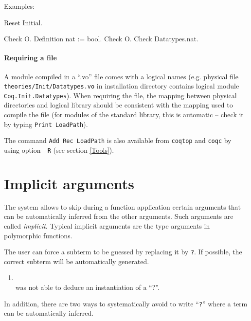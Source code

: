 {\begin{coq_example}
Examples:

\begin{coq_eval}
Reset Initial.
\end{coq_eval}

\begin{coq_example}
Check O.
Definition nat := bool.
Check O.
Check Datatypes.nat.
\end{coq_example}

\paragraph{Requiring a file}

A module compiled in a ``.vo'' file comes with a logical names (e.g. 
physical file \verb!theories/Init/Datatypes.vo! in {\Coq} installation directory contains logical module {\tt Coq.Init.Datatypes}). 
When requiring the file, the mapping between physical directories and logical library should be consistent with the mapping used to compile the file (for modules of the standard library, this is automatic -- check it by typing {\tt Print LoadPath}).

The command {\tt Add Rec LoadPath} is also available from {\tt coqtop}
and {\tt coqc} by using option~\verb=-R= (see section \ref{Tools}).

\section{Implicit arguments}

The {\Coq} system allows to skip during a function application certain
arguments that can be automatically inferred from the other
arguments. Such arguments are called {\em implicit}. Typical implicit
arguments are the type arguments in polymorphic functions.

The user can force a subterm to be guessed by replacing it by
{\tt ?}. If possible, the correct subterm will be automatically generated.

\ErrMsg
\begin{enumerate}
\item {} \\
  {\Coq} was not able to deduce an instantiation of a ``?''.
\end{enumerate}

In addition, there are two ways to systematically avoid to write
``{\tt ?}'' where a term can be automatically inferred.


\end{coq_example}}
